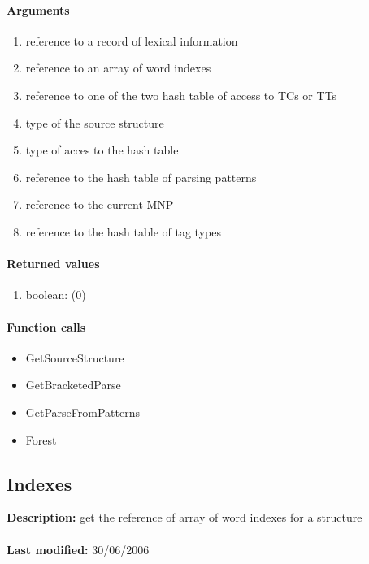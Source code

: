 \paragraph{Arguments}
\begin{enumerate}
\item reference to a record of lexical information
\item reference to an array of word indexes
\item reference to one of the two hash table of access to TCs or TTs
\item type of the source structure
\item type of acces to the hash table
\item reference to the hash table of parsing patterns
\item reference to the current MNP
\item reference to the hash table of tag types
\end{enumerate}

\paragraph{Returned values}
\begin{enumerate}
\item boolean: (0)
\end{enumerate}

\paragraph{Function calls}
\begin{itemize}
\item GetSourceStructure
\item GetBracketedParse
\item GetParseFromPatterns
\item Forest
\end{itemize}

\subsection{Indexes}
\textbf{Description:} get the reference of array of word indexes for a structure\\
\\\textbf{Last modified:} 30/06/2006

